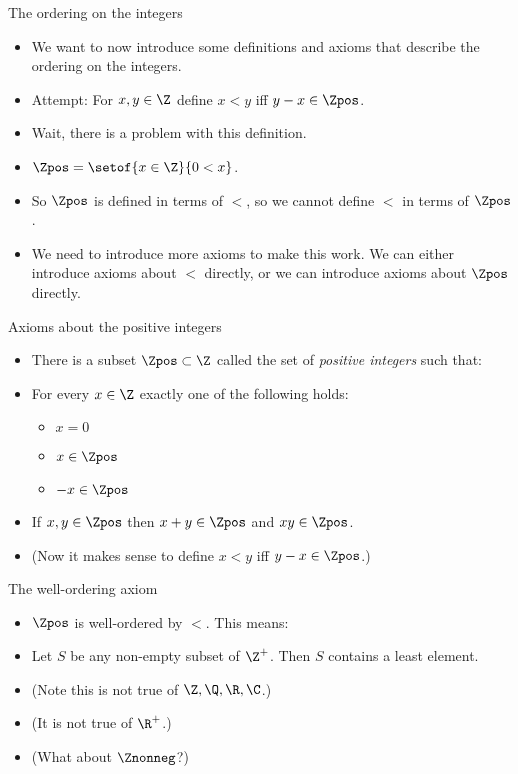 \documentclass{beamer}
\begin{document}
\begin{frame}{The ordering on the integers}

\begin{itemize}
  \item We want to now introduce some definitions and axioms that describe the
  ordering on the integers.
  \item Attempt: For $x,y\in\Z$ define $x<y$ iff $y-x\in\Zpos$.
  \item Wait, there is a problem with this definition.
  \item $\Zpos = \setof{x\in\Z}{0<x}$.
  \item So $\Zpos$ is defined in terms of $<$, so we cannot define $<$ in terms of $\Zpos$.
  \item We need to introduce more axioms to make this work. We can either introduce
  axioms about $<$ directly, or we can introduce axioms about $\Zpos$ directly.
\end{itemize}
\end{frame}

\begin{frame}{Axioms about the positive integers}

\begin{itemize}
  \item There is a subset $\Zpos\subset\Z$ called the set of \emph{positive integers} such that:
  \item For every $x\in\Z$ exactly one of the following holds:
    \begin{itemize}
      \item $x=0$
      \item $x\in\Zpos$
      \item $-x\in\Zpos$
    \end{itemize}
  \item If $x,y\in\Zpos$ then $x+y\in\Zpos$ and $xy\in\Zpos$.
  \item (Now it makes sense to define $x<y$ iff $y-x\in\Zpos$.)
\end{itemize}

\end{frame}

\begin{frame}{The well-ordering axiom}

\begin{itemize}
  \item  $\Zpos$ is well-ordered by $<$. This means:
  \item Let $S$ be any non-empty subset of $\Z^+$. Then $S$ contains
  a least element.
  \item (Note this is not true of $\Z,\Q,\R,\C$.)
  \item (It is not true of $\R^+$.)
  \item (What about $\Znonneg$?)
\end{itemize}

\end{frame}
\end{document}
